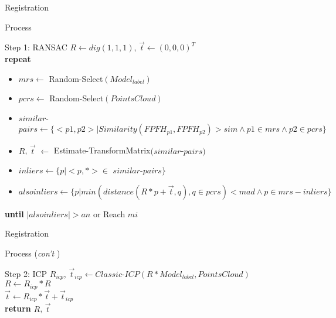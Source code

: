 \documentclass[xcolor=table,compress,blue]{beamer}
\begin{document}
\begin{frame}{Registration}
	\begin{exampleblock}{Process}
	\end{exampleblock}
	\vspace{-20pt}
	\begin{exampleblock}{\small{Step 1: RANSAC}}
		$R\leftarrow dig(1,1,1)$, $\vec t\leftarrow (0,0,0)^T$ 
		\\ \textbf{repeat} 
		\begin{itemize}
		\item $mrs \leftarrow $ Random-Select$(Model_{label})$
		\item $pcrs \leftarrow$ Random-Select$(Points Cloud)$
		\item $similar$-$pairs \leftarrow \{<p1,p2>|Similarity(FPFH_{p1},FPFH_{p2})>sim  \wedge p1 \in mrs \wedge p2 \in pcrs\}$
		\item $R$, $\vec t$ $\leftarrow$ Estimate-TransformMatrix$(similar$-$pairs)$
		\item $inliers \leftarrow \{p| <p,*> \in $ $similar$-$pairs\}$
		\item $alsoinliers \leftarrow \{p| min (distance(R*p+\vec t,q), q\in pcrs) < mad \wedge p \in mrs-inliers \}$
		\end{itemize}
		\textbf{until} \quad $|alsoinliers| > an$ or Reach $mi$
	\end{exampleblock}
\end{frame}
\begin{frame}{Registration}
	\begin{exampleblock}{Process (\emph{con't} )}
	\end{exampleblock}
	\vspace{-20pt}
	\begin{exampleblock}{\small{Step 2: ICP}}
		$R_{icp}$, $\vec t_{icp} \leftarrow Classic$-$ICP(R * Model_{label}, Points Cloud)$
		\\ $R \leftarrow R_{icp} * R$
		\\ $\vec t \leftarrow R_{icp} * \vec t + \vec t_{icp}$
		\\ \textbf{return} $R$, $\vec t$
	\end{exampleblock}
\end{frame}	
\end{document}
